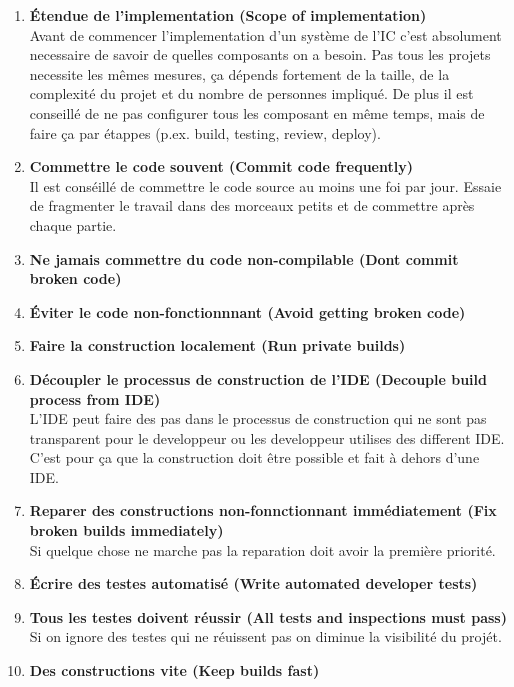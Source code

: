 \begin{enumerate}

\item \textbf{Étendue de l'implementation (Scope of implementation)}\\
Avant de commencer l'implementation d'un système de l'IC c'est absolument necessaire de savoir de quelles composants on a besoin. Pas tous les projets necessite les mêmes mesures, ça dépends fortement de la taille, de la complexité du projet et du nombre de personnes impliqué. 
De plus il est conseillé de ne pas configurer tous les composant en même temps, mais de faire ça par étappes (p.ex. build, testing, review, deploy). 

\item\textbf{Commettre le code souvent (Commit code frequently)}\\
Il est conséillé de commettre le code source au moins une foi par jour. Essaie de fragmenter le travail dans des morceaux petits et de commettre après chaque partie.

\item\textbf{Ne jamais commettre du code non-compilable (Dont commit broken code)}

\item\textbf{Éviter le code non-fonctionnnant (Avoid getting broken code)}

\item\textbf{Faire la construction localement (Run private builds)}

\item\textbf{Découpler le processus de construction de l'IDE (Decouple build process from IDE)}\\
L'IDE peut faire des pas dans le processus de construction qui ne sont pas transparent pour le developpeur ou les developpeur utilises des different IDE. C'est pour ça que la construction doit être possible et fait à dehors d'une IDE.

\item\textbf{Reparer des constructions non-fonnctionnant immédiatement (Fix broken builds immediately)}\\
Si quelque chose ne marche pas la reparation doit avoir la première priorité.

\item\textbf{Écrire des testes automatisé (Write automated developer tests)}

\item\textbf{Tous les testes doivent réussir (All tests and inspections must pass)}\\
Si on ignore des testes qui ne réuissent pas on diminue la visibilité du projét.

\item\textbf{Des constructions vite (Keep builds fast)}\\

\end{enumerate}



